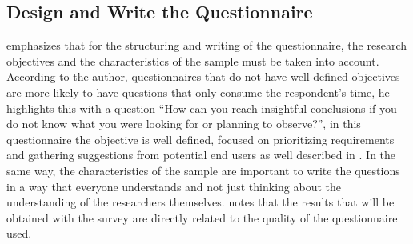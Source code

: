 \subsection{Design and Write the Questionnaire} \label{sec:survey-questionnaire}




 emphasizes that for the structuring and writing of the questionnaire, the research objectives and the characteristics of the sample must be taken into account.
According to the author, questionnaires that do not have well-defined objectives are more likely to have questions that only consume the respondent's time, he highlights this with a question  ``How can you reach insightful conclusions if you do not know what you were looking for or planning to observe?'', in this questionnaire the objective is well defined, focused on prioritizing requirements and gathering suggestions from potential end users as well described in .
In the same way, the characteristics of the sample are important to write the questions in a way that everyone understands and not just thinking about the understanding of the researchers themselves.
 notes that the results that will be obtained with the survey are directly related to the quality of the questionnaire used.

